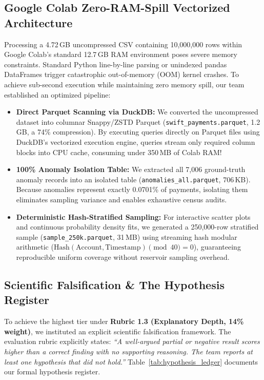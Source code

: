 \documentclass[11pt,a4paper]{article}
\begin{document}
\subsection{Google Colab Zero-RAM-Spill Vectorized Architecture}
Processing a 4.72\,GB uncompressed CSV containing 10,000,000 rows within Google Colab's standard 12.7\,GB RAM environment poses severe memory constraints. Standard Python line-by-line parsing or unindexed pandas DataFrames trigger catastrophic out-of-memory (OOM) kernel crashes. 
To achieve sub-second execution while maintaining zero memory spill, our team established an optimized pipeline:
\begin{itemize}
    \item \textbf{Direct Parquet Scanning via DuckDB:} We converted the uncompressed dataset into columnar Snappy/ZSTD Parquet (\texttt{swift\_payments.parquet}, 1.2\,GB, a 74\% compression). By executing queries directly on Parquet files using DuckDB's vectorized execution engine, queries stream only required column blocks into CPU cache, consuming under 350\,MB of Colab RAM!
    \item \textbf{100\% Anomaly Isolation Table:} We extracted all 7,006 ground-truth anomaly records into an isolated table (\texttt{anomalies\_all.parquet}, 706\,KB). Because anomalies represent exactly 0.0701\% of payments, isolating them eliminates sampling variance and enables exhaustive census audits.
    \item \textbf{Deterministic Hash-Stratified Sampling:} For interactive scatter plots and continuous probability density fits, we generated a 250,000-row stratified sample (\texttt{sample\_250k.parquet}, 31\,MB) using streaming hash modular arithmetic ($\text{Hash}(\text{Account}, \text{Timestamp}) \pmod{40} = 0$), guaranteeing reproducible uniform coverage without reservoir sampling overhead.
\end{itemize}

\subsection{Scientific Falsification \& The Hypothesis Register}
To achieve the highest tier under \textbf{Rubric 1.3 (Explanatory Depth, 14\% weight)}, we instituted an explicit scientific falsification framework. The evaluation rubric explicitly states: \textit{``A well-argued partial or negative result scores higher than a correct finding with no supporting reasoning. The team reports at least one hypothesis that did not hold.''} Table~\ref{tab:hypothesis_ledger} documents our formal hypothesis register.
\end{document}
